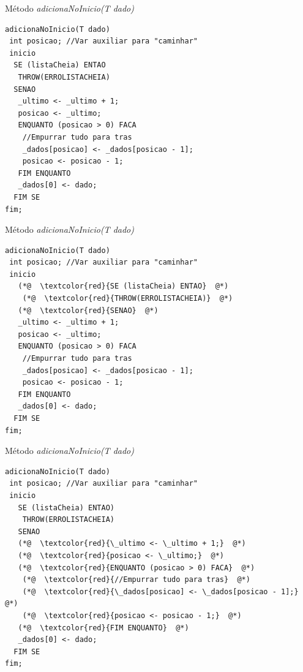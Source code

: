 \documentclass[12pt,table,xcolor={dvipsnames}]{beamer}
\begin{document}
\begin{frame}[fragile]{Método \textit{adicionaNoInicio(T dado)}}
\begin{lstlisting}
adicionaNoInicio(T dado)
 int posicao; //Var auxiliar para "caminhar"
 inicio
  SE (listaCheia) ENTAO
   THROW(ERROLISTACHEIA)
  SENAO
   _ultimo <- _ultimo + 1;
   posicao <- _ultimo;
   ENQUANTO (posicao > 0) FACA
    //Empurrar tudo para tras
    _dados[posicao] <- _dados[posicao - 1];
    posicao <- posicao - 1;
   FIM ENQUANTO
   _dados[0] <- dado;
  FIM SE
fim;
\end{lstlisting}
\end{frame}

\begin{frame}[fragile]{Método \textit{adicionaNoInicio(T dado)}}
\begin{lstlisting}
adicionaNoInicio(T dado)
 int posicao; //Var auxiliar para "caminhar"
 inicio
   (*@  \textcolor{red}{SE (listaCheia) ENTAO}  @*)
    (*@  \textcolor{red}{THROW(ERROLISTACHEIA)}  @*)
   (*@  \textcolor{red}{SENAO}  @*)
   _ultimo <- _ultimo + 1;
   posicao <- _ultimo;
   ENQUANTO (posicao > 0) FACA
    //Empurrar tudo para tras
    _dados[posicao] <- _dados[posicao - 1];
    posicao <- posicao - 1;
   FIM ENQUANTO
   _dados[0] <- dado;
  FIM SE
fim;
\end{lstlisting}
\end{frame}

\begin{frame}[fragile]{Método \textit{adicionaNoInicio(T dado)}}
\begin{lstlisting}
adicionaNoInicio(T dado)
 int posicao; //Var auxiliar para "caminhar"
 inicio
   SE (listaCheia) ENTAO)
    THROW(ERROLISTACHEIA)
   SENAO
   (*@  \textcolor{red}{\_ultimo <- \_ultimo + 1;}  @*)
   (*@  \textcolor{red}{posicao <- \_ultimo;}  @*)
   (*@  \textcolor{red}{ENQUANTO (posicao > 0) FACA}  @*)
    (*@  \textcolor{red}{//Empurrar tudo para tras}  @*)
    (*@  \textcolor{red}{\_dados[posicao] <- \_dados[posicao - 1];}  @*)
    (*@  \textcolor{red}{posicao <- posicao - 1;}  @*)
   (*@  \textcolor{red}{FIM ENQUANTO}  @*)
   _dados[0] <- dado;
  FIM SE
fim;
\end{lstlisting}
\end{frame}
\end{document}
